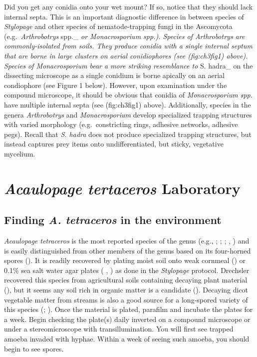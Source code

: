\documentclass[]{book}
\begin{document}
Did you get any conidia onto your wet mount? If so, notice that they should lack internal septa. This is an important diagnostic difference in between species of \emph{Stylopage} and other species of nematode-trapping fungi in the Ascomycota (e.g.~\emph{Arthrobotrys} spp.\_ \emph{or \emph{Monacrosporium} spp.). Species of \emph{Arthrobotrys} are commonly-isolated from soils. They produce conidia with a single internal septum that are borne in large clusters on aerial conidiophores (see \citet{ref}(fig:ch3fig1) above). Species of \emph{Monacrosporium} bear a more striking resemblance to} S. hadra\_ on the dissecting microscope as a single conidium is borne apically on an aerial condiophore (see Figure 1 below). However, upon examination under the compound microscope, it should be obvious that conidia of \emph{Monacrosporium spp.} have multiple internal septa (see \citet{ref}(fig:ch3fig1) above). Additionally, species in the genera \emph{Arthrobotrys} and \emph{Monacrosporium} develop specialized trapping structures with varied morphology (e.g.~constricting rings, adhesive networks, adhesive pegs). Recall that \emph{S. hadra} does not produce specialized trapping structures, but instead captures prey items onto undifferentiated, but sticky, vegetative mycelium.

\hypertarget{acaulopage-tertaceros-laboratory}{%
\section{\texorpdfstring{\emph{Acaulopage tertaceros} Laboratory}{Acaulopage tertaceros Laboratory}}\label{acaulopage-tertaceros-laboratory}}

\hypertarget{finding-a.-tetraceros-in-the-environment}{%
\subsection{\texorpdfstring{Finding \emph{A. tetraceros} in the environment}{Finding A. tetraceros in the environment}}\label{finding-a.-tetraceros-in-the-environment}}

\emph{Acaulopage tetraceros} is the most reported species of the genus (e.g., \citet{Jones_1959}; \citet{Park_1971}; \citet{Saikawa_2002}; \citet{Michel_2014}, \citeyearpar{Michel_2015}) and is easily distinguished from other members of the genus based on its four-horned spores (\citet{Drechsler_1935A}). It is readily recovered by plating moist soil onto weak cornmeal (\citet{Drechsler_1935B}) or 0.1\% sea salt water agar plates ( \citet{Michel_2014}, \citeyearpar{Michel_2015}) as done in the \emph{Stylopage} protocol. Drechsler recovered this species from agricultural soils containing decaying plant material (\citet{Drechsler_1935B}), but it seems any soil rich in organic matter is a candidate (\citet{Saikawa_2002}). Decaying dicot vegetable matter from streams is also a good source for a long-spored variety of this species (\citet{Jones_1959}; \citet{Park_1971}). Once the material is plated, parafilm and incubate the plates for a week. Begin checking the plate(s) daily inverted on a compound microscope or under a stereomicroscope with transillumination. You will first see trapped amoeba invaded with hyphae. Within a week of seeing such amoeba, you should begin to see spores.
\end{document}
